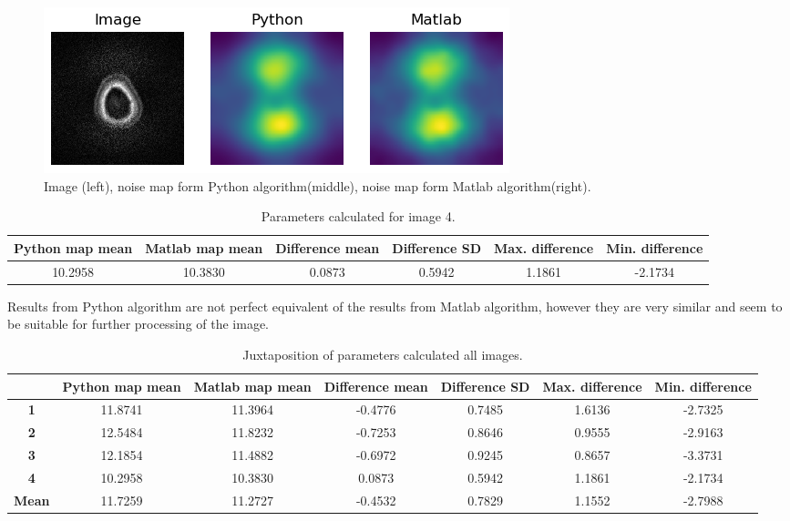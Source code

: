 \begin{itemize}
\begin{figure}[H]
	\centering
	\captionsetup{justification=centering}
		\includegraphics[scale=0.7]{figures/module03/160_comp}
		\caption{Image (left), noise map form Python algorithm(middle), noise map form Matlab algorithm(right).} 
\end{figure}
\begin{table}[H]
\caption{\label{tab:table-name}Parameters calculated for image 4.}
	\begin{center}
		\begin{tabular}{ |c|c|c|c|c|c| } 
 			\hline
 			\textbf{Python map mean} & \textbf{Matlab map mean} & \textbf{Difference mean} & \textbf{Difference SD} & \textbf{Max. difference} & 					\textbf{Min. difference} \\ 
			\hline
 			10.2958 & 10.3830 & 0.0873 & 0.5942 & 1.1861 & -2.1734 \\ 
			\hline
		\end{tabular}
	\end{center}
\end{table}
\end{itemize}
Results from Python algorithm are not perfect equivalent of the results from Matlab algorithm, however they are very similar and seem to be suitable for 
further processing of the image.
\begin{table}[H]
\small
\caption{\label{tab:table-name}Juxtaposition of parameters calculated all images.}
	\begin{center}
		\begin{tabular}{ |c|c|c|c|c|c|c| } 
 			\hline
 			 & \textbf{Python map mean} & \textbf{Matlab map mean} & \textbf{Difference mean} & \textbf{Difference SD} & \textbf{Max. difference} & 				\textbf{Min. difference} \\ 
			\hline
 			\textbf{1} & 11.8741 & 11.3964 & -0.4776 & 0.7485 & 1.6136 & -2.7325 \\ 
			\hline
			\textbf{2} & 12.5484 & 11.8232 & -0.7253 & 0.8646 & 0.9555 & -2.9163 \\ 
			\hline
			\textbf{3} & 12.1854 & 11.4882 & -0.6972 & 0.9245 & 0.8657 & -3.3731 \\ 
			\hline
			\textbf{4} & 10.2958 & 10.3830 & 0.0873 & 0.5942 & 1.1861 & -2.1734 \\ 
			\hline
			\textbf{Mean} & 11.7259 & 11.2727 & -0.4532 & 0.7829 & 1.1552 & -2.7988 \\ 
			\hline
		\end{tabular}
	\end{center}
\end{table}